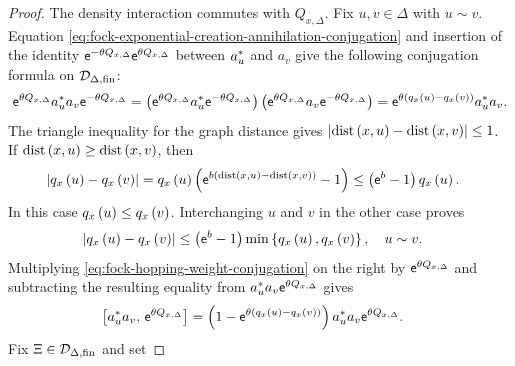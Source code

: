 \documentclass[11pt,a4paper]{article}
\theoremstyle{plain}
\theoremstyle{definition}
\theoremstyle{remark}
\begin{document}
\begin{proof}
The density interaction commutes with $Q_{x,\Delta}$.
Fix $u,v\in\Delta$ with $u\sim v$.
Equation \eqref{eq:fock-exponential-creation-annihilation-conjugation} and insertion of the identity
$\mathsf{e}^{-\theta Q_{x,\Delta}}\mathsf{e}^{\theta Q_{x,\Delta}}$
between $a_u^{\ast}$ and $a_v$ give the following conjugation formula on
$\sphilb{D}_{\Delta,\txtfin}$:
\begin{equation}
\begin{aligned}
\mathsf{e}^{\theta Q_{x,\Delta}}
a_u^{\ast}a_v
\mathsf{e}^{-\theta Q_{x,\Delta}}
=
\left( \mathsf{e}^{\theta Q_{x,\Delta}}
a_u^{\ast}\mathsf{e}^{-\theta Q_{x,\Delta}} \right)
\left( \mathsf{e}^{\theta Q_{x,\Delta}}
a_v\mathsf{e}^{-\theta Q_{x,\Delta}} \right)
=
\mathsf{e}^{\theta\left( q_x \left( u \right) - q_x \left( v \right) \right)}a_u^{\ast}a_v.
\end{aligned}
\label{eq:fock-hopping-weight-conjugation}
\end{equation}
The triangle inequality for the graph distance gives
$\left| \operatorname{dist} \left( x,u \right)-\operatorname{dist} \left( x,v \right) \right|\leq1$.
If $\operatorname{dist} \left( x,u \right)\geq\operatorname{dist} \left( x,v \right)$, then
$$\begin{aligned}
\left| q_x \left( u \right) - q_x \left( v \right) \right|
& =
q_x \left( u \right)
\left( 
\mathsf{e}^{b\left( 
\operatorname{dist} \left( x,u \right)-\operatorname{dist} \left( x,v \right) \right)}
-1 \right)
\leq
\left( \mathsf{e}^b-1 \right)q_x \left( u \right).
\end{aligned}$$
In this case $q_x \left( u \right)\leq q_x \left( v \right)$.
Interchanging $u$ and $v$ in the other case proves
\begin{equation}
\begin{aligned}
\left| q_x \left( u \right) - q_x \left( v \right) \right|
& \leq
\left( \mathsf{e}^{b} - 1 \right)
\min\left\{ q_x \left( u \right),q_x \left( v \right) \right\},
\quad
u\sim v.
\end{aligned}
\label{eq:fock-q-edge-difference-bound}
\end{equation}
Multiplying \eqref{eq:fock-hopping-weight-conjugation} on the right by $\mathsf{e}^{\theta Q_{x,\Delta}}$ and subtracting
the resulting equality from $a_u^{\ast}a_v\mathsf{e}^{\theta Q_{x,\Delta}}$ gives
\begin{equation}
\begin{aligned}
\left[ a_u^{\ast}a_v,\,\mathsf{e}^{\theta Q_{x,\Delta}} \right]
& =
\left( 
1-
\mathsf{e}^{\theta\left( q_x \left( u \right)-q_x \left( v \right) \right)} \right)
a_u^{\ast}a_v
\mathsf{e}^{\theta Q_{x,\Delta}}.
\end{aligned}
\label{eq:fock-weighted-hopping-commutator}
\end{equation}
Fix $\Xi\in\sphilb{D}_{\Delta,\txtfin}$ and set

\end{proof}
\end{document}
